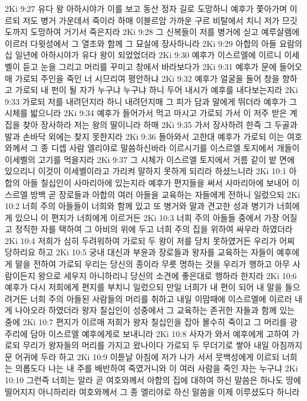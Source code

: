 2Ki 9:27  유다 왕 아하시야가 이를 보고 동산 정자 길로 도망하니 예후가 쫓아가며 이르되 저도 병거 가운데서 죽이라 하매 이블르암 가까운 구르 비탈에서 치니 저가 므깃도까지 도망하여 거기서 죽은지라
2Ki 9:28  그 신복들이 저를 병거에 싣고 예루살렘에 이르러 다윗성에서 그 열조와 함께 그 묘실에 장사하니라
2Ki 9:29  아합의 아들 요람의 십 일년에 아하시야가 유다 왕이 되었었더라
2Ki 9:30  예후가 이스르엘에 이르니 이세벨이 듣고 눈을 그리고 머리를 꾸미고 창에서 바라보다가
2Ki 9:31  예후가 문에 들어오매 가로되 주인을 죽인 너 시므리여 평안하냐
2Ki 9:32  예후가 얼굴을 들어 창을 향하고 가로되 내 펀이 될 자가 누구냐 누구냐 하니 두어 내시가 예후를 내다보는지라
2Ki 9:33  가로되 저를 내려던지라 하니 내려던지매 그 피가 담과 말에게 뛰더라 예후가 그 시체를 밟으니라
2Ki 9:34  예후가 들어가서 먹고 마시고 가로되 가서 이 저주 받은 계집을 찾아 장사하라 저는 왕의 딸이니라 하매
2Ki 9:35  가서 장사하려 한즉 그 두골과 발과 손바닥 외에는 찾지 못한지라
2Ki 9:36  돌아와서 고한대 예후가 가로되 이는 여호와께서 그 종 디셉 사람 엘리야로 말씀하신바라 이르시기를 이스르엘 토지에서 개들이 이세벨의 고기를 먹을지라
2Ki 9:37  그 시체가 이스르엘 토지에서 거름 같이 밭 면에 있으리니 이것이 이세벨이라고 가리켜 말하지 못하게 되리라 하셨느니라
2Ki 10:1  아합의 아들 칠십인이 사마리아에 있는지라 예후가 편지들을 써서 사마리아에 보내어 이스르엘 방백 곧 장로들과 아합의 여러 아들을 교육하는 자들에게 전하니 일렀으되
2Ki 10:2  너희 주의 아들들이 너희와 함께 있고 또 병거와 말과 견고한 성과 병기가 너희에게 있으니 이 편지가 너희에게 이르거든
2Ki 10:3  너희 주의 아들들 중에서 가장 어질고 정직한 자를 택하여 그 아비의 위에 두고 너희 주의 집을 위하여 싸우라 하였더라
2Ki 10:4  저희가 심히 두려워하여 가로되 두 왕이 저를 당치 못하였거든 우리가 어찌 당하리요 하고
2Ki 10:5  궁내 대신과 부윤과 장로들과 왕자를 교육하는 자들이 예후에게 말을 전하여 가로되 우리는 당신의 종이라 무릇 명하는 것을 우리가 행하고 아무 사람이든지 왕으로 세우지 아니하리니 당신의 소견에 좋은대로 행하라 한지라
2Ki 10:6  예후가 다시 저희에게 편지를 부치니 일렀으되 만일 너희가 내 편이 되어 내 말을 들으려거든 너희 주의 아들된 사람들의 머리를 취하고 내일 이맘때에 이스르엘에 이르러 내게 나아오라 하였더라 왕자 칠십인이 성중에서 그 교육하는 존귀한 자들과 함께 있는 중에
2Ki 10:7  편지가 이르매 저희가 왕자 칠십인을 잡아 몰수히 죽이고 그 머리를 광주리에 담아 이스르엘 예후에게로 보내니라
2Ki 10:8  사자가 와서 예후에게 고하여 가로되 무리가 왕자들의 머리를 가지고 왔나이다 가로되 두 무더기로 쌓아 내일 아침까지 문 어귀에 두라 하고
2Ki 10:9  이튿날 아침에 저가 나가 서서 뭇백성에게 이르되 너희는 의롭도다 나는 내 주를 배반하여 죽였거니와 이 여러 사람을 죽인 자는 누구냐
2Ki 10:10  그런즉 너희는 알라 곧 여호와께서 아합의 집에 대하여 하신 말씀은 하나도 땅에 떨어지지 아니하리라 여호와께서 그 종 엘리야로 하신 말씀을 이제 이루셨도다 하니라
